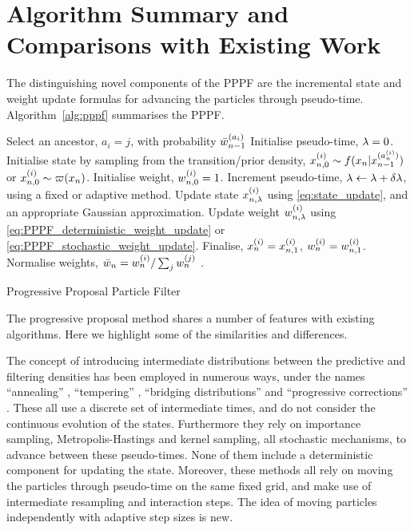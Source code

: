 \documentclass{article}
\begin{document}
\section{Algorithm Summary and Comparisons with Existing Work}

The distinguishing novel components of the PPPF are the incremental state and weight update formulas for advancing the particles through pseudo-time. Algorithm~\ref{alg:pppf} summarises the PPPF.

\begin{algorithm}
\begin{algorithmic}[1]
        \STATE Select an ancestor, $a_i=j$, with probability $\bar{w}_{n-1}^{(a_i)}$
      \ENDIF
      \STATE Initialise pseudo-time, $\lambda=0$.
      \STATE Initialise state by sampling from the transition/prior density, $x_{n,0}^{(i)} \sim f(x_{n} | x_{n-1}^{(a_{n}^{(i)})})$ or $x_{n,0}^{(i)} \sim \varpi(x_{n})$.
      \STATE Initialise weight, $w_{n,0}^{(i)} = 1$.
        \STATE Increment pseudo-time, $\lambda \leftarrow \lambda+\delta\lambda$, using a fixed or adaptive method.
        \STATE Update state $x_{n,\lambda}^{(i)}$ using \eqref{eq:state_update}, and an appropriate Gaussian approximation.
        \STATE Update weight $w_{n,\lambda}^{(i)}$ using \eqref{eq:PPPF_deterministic_weight_update} or \eqref{eq:PPPF_stochastic_weight_update}.
      \ENDWHILE
      \STATE Finalise, $x_{n}^{(i)} = x_{n,1}^{(i)}$, $w_{n}^{(i)} = w_{n,1}^{(i)}$.
    \ENDFOR
    \STATE Normalise weights, $\bar{w}_{n} = w_{n}^{(i)} / \sum_j w_{n}^{(j)}$ .
  \ENDFOR
\end{algorithmic}
\caption{Progressive Proposal Particle Filter}
\label{alg:pppf}
\end{algorithm}

The progressive proposal method shares a number of features with existing algorithms. Here we highlight some of the similarities and differences.

The concept of introducing intermediate distributions between the predictive and filtering densities has been employed in numerous ways, under the names ``annealing'' \citep{Neal2001,Deutscher2000,Gall2007}, ``tempering'' \citep{DelMoral2006}, ``bridging distributions'' \citep{Godsill2001b} and ``progressive corrections'' \citep{Oudjane2000}. These all use a discrete set of intermediate times, and do not consider the continuous evolution of the states. Furthermore they rely on importance sampling, Metropolis-Hastings and kernel sampling, all stochastic mechanisms, to advance between these pseudo-times. None of them include a deterministic component for updating the state. Moreover, these methods all rely on moving the particles through pseudo-time on the same fixed grid, and make use of intermediate resampling and interaction steps. The idea of moving particles independently with adaptive step sizes is new.
\end{document}
